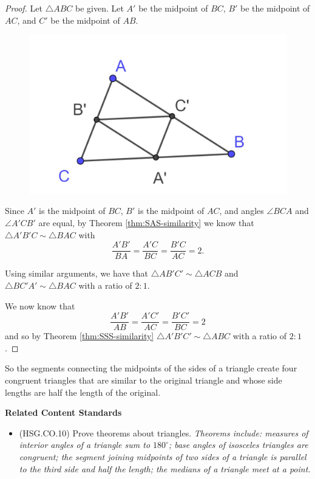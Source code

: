 \documentclass[
]{book}
\providecommand{\tightlist}{%
  \setlength{\itemsep}{0pt}\setlength{\parskip}{0pt}}
\newenvironment{standards}{}{}
\theoremstyle{definition}
\theoremstyle{definition}
\theoremstyle{definition}
\theoremstyle{definition}
\theoremstyle{remark}
\begin{document}
\begin{proof}

Let \(\triangle ABC\) be given. Let \(A'\) be the midpoint of \(BC\), \(B'\) be the midpoint of \(AC\), and \(C'\) be the midpoint of \(AB\).

\begin{figure}

{\centering \includegraphics[width=0.3\linewidth]{images/midpoint-triangle-similarity} 

}

\end{figure}

Since \(A'\) is the midpoint of \(BC\), \(B'\) is the midpoint of \(AC\), and angles \(\angle BCA\) and \(\angle A'CB'\) are equal, by Theorem \ref{thm:SAS-similarity} we know that \(\triangle A'B'C\sim \triangle BAC\) with \[\frac{A'B'}{BA}= \frac{A'C}{BC} = \frac{B'C}{AC}=2.\]

Using similar arguments, we have that \(\triangle AB'C' \sim \triangle ACB\) and \(\triangle BC'A' \sim \triangle BAC\) with a ratio of \(2:1\).

We now know that \[\frac{A'B'}{AB}=\frac{A'C'}{AC} = \frac{B'C'}{BC} = 2\] and so by Theorem \ref{thm:SSS-similarity} \(\triangle A'B'C' \sim \triangle ABC\) with a ratio of \(2:1\).

\end{proof}

So the segments connecting the midpoints of the sides of a triangle create four congruent triangles that are similar to the original triangle and whose side lengths are half the length of the original.

\begin{standards}

\begin{center}
\textbf{Related Content Standards}

\end{center}

\begin{itemize}
\tightlist
\item
  (HSG.CO.10) Prove theorems about triangles. \emph{Theorems include: measures of interior angles of a triangle sum to \(180^\circ\); base angles of isosceles triangles are congruent; the segment joining midpoints of two sides of a triangle is parallel to the third side and half the length; the medians of a triangle meet at a point.}
\end{itemize}

\end{standards}
\end{document}
